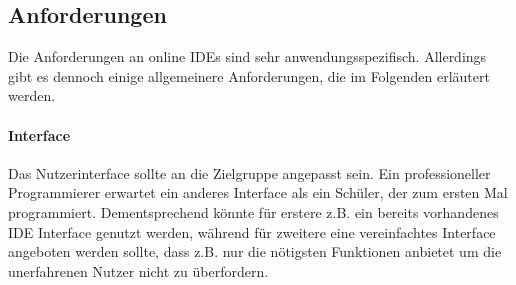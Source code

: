 \subsection{Anforderungen}\label{section:stand-der-technik:literaturrecherche:anforderungen}

Die Anforderungen an online IDEs sind sehr anwendungsspezifisch. Allerdings gibt es dennoch einige allgemeinere Anforderungen, die im Folgenden erläutert werden.


\paragraph{Interface}
Das Nutzerinterface sollte an die Zielgruppe angepasst sein. Ein professioneller Programmierer erwartet ein anderes Interface als ein Schüler, der zum ersten Mal programmiert. Dementsprechend könnte für erstere z.B. ein bereits vorhandenes IDE Interface genutzt werden, während für zweitere eine vereinfachtes Interface angeboten werden sollte, dass z.B. nur die nötigsten Funktionen anbietet um die unerfahrenen Nutzer nicht zu überfordern.

